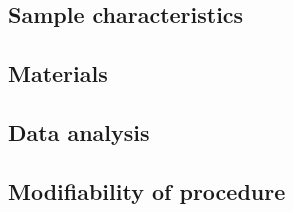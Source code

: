 \documentclass[12pt,a4paper]{article}
\begin{document}
\subsection{Sample characteristics}

\subsection{Materials}

\subsection{Data analysis}

\subsection{Modifiability of procedure}
\end{document}
